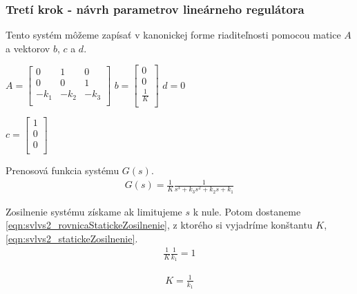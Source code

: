 \documentclass[../main.tex]{subfiles}
\begin{document}
\subsubsection{Tretí krok - návrh parametrov lineárneho regulátora}
Tento systém môžeme zapísať v kanonickej forme riaditeľnosti pomocou matice $A$ a vektorov $b$, $c$ a $d$.
        \begin{center}
		$ A = 
			\begin{bmatrix} 
			0 & 1 & 0 \\ 
			0 & 0 & 1 \\ 
			-k_1 & -k_2 & -k_3  \\ 
			\end{bmatrix}$
		$ b = 
			\begin{bmatrix} 
			0 \\ 
			0 \\ 
			\frac{1}{K}  \\ 
			\end{bmatrix}$
		$ d = 0$

		$ c = 
			\begin{bmatrix} 
			1 \\ 0 \\ 0  \\
			\end{bmatrix}$
        \end{center}
Prenosová funkcia systému $G(s)$.
	\begin{equation}
		\begin{aligned}
		G(s) = \frac{1}{K}\frac{1}{s^3+k_3s^2+k_2s+k_1}
		\end{aligned}
		\label{eqn:svlvs2_linearnySystemPrenos}
	\end{equation}

Zosilnenie systému získame ak limitujeme $s$ k nule. Potom dostaneme \cref{eqn:svlvs2_rovnicaStatickeZosilnenie}, z ktorého si vyjadríme konštantu $K$,  \cref{eqn:svlvs2_statickeZosilnenie}.
	\begin{equation}
		\begin{aligned}
		\frac{1}{K}\frac{1}{k_1} = 1
		\end{aligned}
		\label{eqn:svlvs2_rovnicaStatickeZosilnenie}
	\end{equation}

	\begin{equation}
		\begin{aligned}
		K = \frac{1}{k_1}
		\end{aligned}
		\label{eqn:svlvs2_statickeZosilnenie}
	\end{equation}
\end{document}
